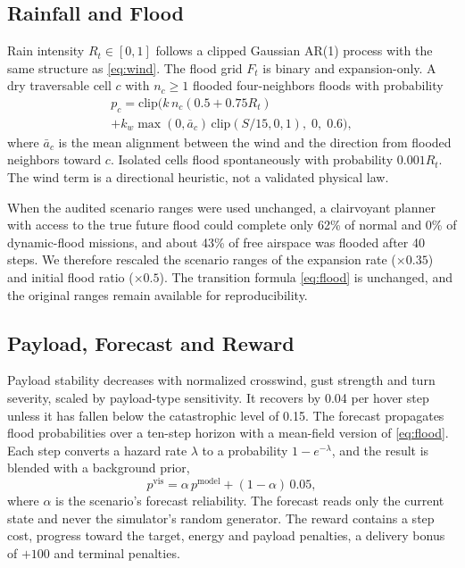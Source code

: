 \documentclass{ieeeaccess}
\begin{document}
\subsection{Rainfall and Flood}
Rain intensity $R_t\in[0,1]$ follows a clipped Gaussian AR(1) process with the same structure as \eqref{eq:wind}. The flood grid $F_t$ is binary and expansion-only. A dry traversable cell $c$ with $n_c\ge1$ flooded four-neighbors floods with probability
\begin{multline}
p_c=\mathrm{clip}\big(k\,n_c(0.5+0.75R_t)\\
+k_w\max(0,\bar a_c)\,\mathrm{clip}(S/15,0,1),\;0,\;0.6\big),
\label{eq:flood}
\end{multline}
where $\bar a_c$ is the mean alignment between the wind and the direction from flooded neighbors toward $c$. Isolated cells flood spontaneously with probability $0.001R_t$. The wind term is a directional heuristic, not a validated physical law.

When the audited scenario ranges were used unchanged, a clairvoyant planner with access to the true future flood could complete only 62\% of normal and 0\% of dynamic-flood missions, and about 43\% of free airspace was flooded after 40 steps. We therefore rescaled the scenario ranges of the expansion rate ($\times0.35$) and initial flood ratio ($\times0.5$). The transition formula \eqref{eq:flood} is unchanged, and the original ranges remain available for reproducibility.

\subsection{Payload, Forecast and Reward}
Payload stability decreases with normalized crosswind, gust strength and turn severity, scaled by payload-type sensitivity. It recovers by 0.04 per hover step unless it has fallen below the catastrophic level of 0.15. The forecast propagates flood probabilities over a ten-step horizon with a mean-field version of \eqref{eq:flood}. Each step converts a hazard rate $\lambda$ to a probability $1-e^{-\lambda}$, and the result is blended with a background prior,
\begin{equation}
p^{\mathrm{vis}}=\alpha\,p^{\mathrm{model}}+(1-\alpha)\,0.05,
\label{eq:blend}
\end{equation}
where $\alpha$ is the scenario's forecast reliability. The forecast reads only the current state and never the simulator's random generator. The reward contains a step cost, progress toward the target, energy and payload penalties, a delivery bonus of $+100$ and terminal penalties.
\end{document}
